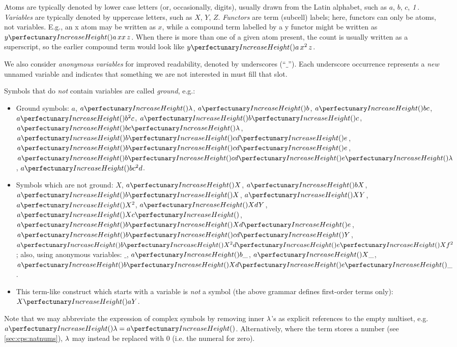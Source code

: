 Atoms are typically denoted by lower case letters (or, occasionally, digits), usually drawn from the Latin alphabet, 
such as \(a\), \(b\), \(c\), \(\mathit{1}\). 
\emph{Variables} are typically denoted by uppercase letters, 
such as \(X\), \(Y\), \(Z\).
\emph{Functors} are term (subcell) labels; here, functors can only be atoms, not variables.  
E.g., an x atom may be written as \(x\), while a compound term labelled by a y functor might be written as \(\cpfunc{y}{a \, xx \, z}\).  When there is more than one of a given atom present, the count is usually written as a superscript, so the earlier compound term would look like \(\cpfunc{y}{a \, x^2 \, z}\).

We also consider \emph{anonymous variables} for improved readability, denoted by underscores (``\(\_\)'').
Each underscore occurrence represents a \emph{new} unnamed variable
and indicates that something we are not interested in must fill that slot.

Symbols that do \emph{not} contain variables are called \emph{ground}, e.g.:
\begin{itemize}
\item Ground symbols:
\(a\), \(\cpfunc{a}{\cpempty}\), \(\cpfunc{a}{b}\), \(\cpfunc{a}{b c}\), \(\cpfunc{a}{b^2 c}\), \(\cpfunc{a}{\cpfunc{b}{c}}\), \(\cpfunc{a}{b\cpfunc{c}{\cpempty}}\), \(\cpfunc{a}{\cpfunc{b}{c}\cpfunc{d}{e}}\), \(\cpfunc{a}{\cpfunc{b}{c}\cpfunc{d}{e}}\), \(\cpfunc{a}{\cpfunc{b}{c}\cpfunc{d}{\cpfunc{e}{\cpempty}}}\), \(\cpfunc{a}{bc^2 d}\).

\smallskip
\item Symbols which are not ground:
\(X\), \(\cpfunc{a}{X}\), \(\cpfunc{a}{bX}\), \(\cpfunc{a}{\cpfunc{b}{X}}\), \(\cpfunc{a}{XY}\), \(\cpfunc{a}{X^2}\), \(\cpfunc{a}{XdY}\),  \(\cpfunc{a}{X\cpfunc{c}{}}\), \(\cpfunc{a}{\cpfunc{b}{X}\cpfunc{d}{e}}\), \(\cpfunc{a}{\cpfunc{b}{c}\cpfunc{d}{Y}}\), \(\cpfunc{a}{\cpfunc{b}{X^2}\cpfunc{d}{\cpfunc{e}{Xf^2}}}\);
also, using anonymous variables: \(\_\), \(\cpfunc{a}{b\_}\), \(\cpfunc{a}{X\_}\), \(\cpfunc{a}{\cpfunc{b}{X}\cpfunc{d}{\cpfunc{e}{\_}}}\).

\smallskip
\item This term-like construct which starts with a variable is \emph{not} a symbol (the above grammar defines first-order terms only):
\(\cpfunc{X}{a Y}\).
\end{itemize}

Note that we may abbreviate the expression of complex symbols 
by removing inner \(\lambda\)'s as explicit references to the empty multiset, 
e.g.~\(\cpfunc{a}{\cpempty} = \cpfunc{a}{}\).  Alternatively, where the term stores a number (see \cref{sec:cps:natnums}), \(\lambda\) may instead be replaced with \(0\) (i.e. the numeral for zero).

